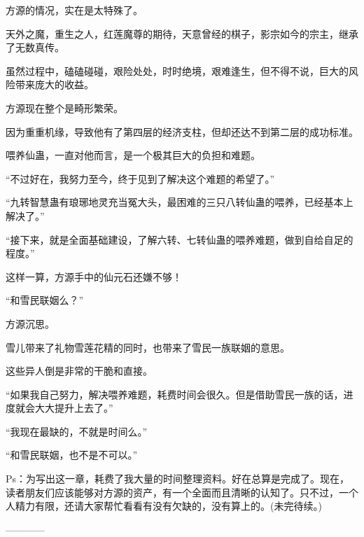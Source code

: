 \begin{this_body}
方源的情况，实在是太特殊了。

天外之魔，重生之人，红莲魔尊的期待，天意曾经的棋子，影宗如今的宗主，继承了无数真传。

虽然过程中，磕磕碰碰，艰险处处，时时绝境，艰难逢生，但不得不说，巨大的风险带来庞大的收益。

方源现在整个是畸形繁荣。

因为重重机缘，导致他有了第四层的经济支柱，但却还达不到第二层的成功标准。

喂养仙蛊，一直对他而言，是一个极其巨大的负担和难题。

“不过好在，我努力至今，终于见到了解决这个难题的希望了。”

“九转智慧蛊有琅琊地灵充当冤大头，最困难的三只八转仙蛊的喂养，已经基本上解决了。”

“接下来，就是全面基础建设，了解六转、七转仙蛊的喂养难题，做到自给自足的程度。”

这样一算，方源手中的仙元石还嫌不够！

“和雪民联姻么？”

方源沉思。

雪儿带来了礼物雪莲花精的同时，也带来了雪民一族联姻的意思。

这些异人倒是非常的干脆和直接。

“如果我自己努力，解决喂养难题，耗费时间会很久。但是借助雪民一族的话，进度就会大大提升上去了。”

“我现在最缺的，不就是时间么。”

“和雪民联姻，也不是不可以。”

Ps：为写出这一章，耗费了我大量的时间整理资料。好在总算是完成了。现在，读者朋友们应该能够对方源的资产，有一个全面而且清晰的认知了。只不过，一个人精力有限，还请大家帮忙看看有没有欠缺的，没有算上的。(未完待续。)

------------

\end{this_body}

